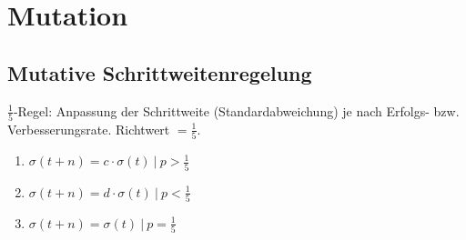 
\section{Mutation}
\label{sec:mutation}

\subsection{Mutative Schrittweitenregelung}

$\frac{1}{5}$-Regel: Anpassung der Schrittweite (Standardabweichung) je nach Erfolgs- bzw. Verbesserungsrate. Richtwert $= \frac{1}{5}$.

\begin{enumerate}
	\item $\sigma(t+n) = c \cdot \sigma(t)\ |\ p > \frac{1}{5}$
    \item $\sigma(t+n) = d \cdot \sigma(t)\ |\ p < \frac{1}{5}$
    \item $\sigma(t+n) = \sigma(t)\ |\ p = \frac{1}{5}$
\end{enumerate}
